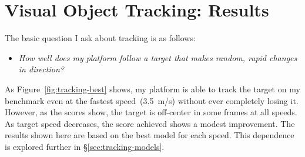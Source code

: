 \section{Visual Object Tracking: Results}
\label{sec:tracking-results}
The basic question I ask about tracking is as follows:
\begin{itemize}
\item{\em How well does my platform follow a target that makes random,
  rapid changes in direction?}
\end{itemize}
As Figure~\ref{fig:tracking-best} shows, my platform is able to track
the target on my benchmark even at the fastest speed~(3.5~m/s)
without ever completely losing it.  However, as the scores show, the
target is off-center in some frames at all speeds.  As target speed
decreases, the score achieved shows a modest improvement.  The results
shown here are based on the best model for each speed.  This
dependence is explored further in \S\ref{sec:tracking-models}.

